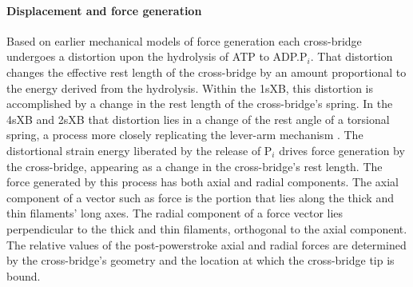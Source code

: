\documentclass[]{article}
\begin{document}
\paragraph{Displacement and force generation} %
Based on earlier mechanical models of force generation \citep{Pate1989, Daniel1998, Tanner2007} each cross-bridge undergoes a distortion upon the hydrolysis of ATP to ADP.P$_i$.  
That distortion changes the effective rest length of the cross-bridge by an amount proportional to the energy derived from the hydrolysis.  
Within the 1sXB, this distortion is accomplished by a change in the rest length of the cross-bridge's spring. 
In the 4sXB and 2sXB that distortion lies in a change of the rest angle of a torsional spring, a process more closely replicating the lever-arm mechanism \citep{Reedy2000}.
The distortional strain energy liberated by the release of P$_i$ drives force generation by the cross-bridge, appearing as a change in the cross-bridge's rest length.  
The force generated by this process has both axial and radial components. 
The axial component of a vector such as force is the portion that lies along the thick and thin filaments' long axes. 
The radial component of a force vector lies perpendicular to the thick and thin filaments, orthogonal to the axial component. 
The relative values of the post-powerstroke axial and radial forces are determined by the cross-bridge's geometry and the location at which the cross-bridge tip is bound. 
\end{document}
